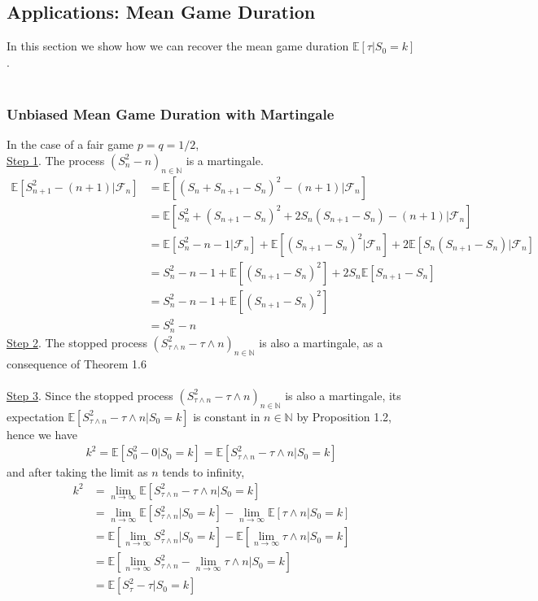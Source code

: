\documentclass[12pt]{extarticle}
\newcommand{\<}{\langle}
\renewcommand{\>}{\rangle}
\theoremstyle{definition}
\begin{document}
\newpage
\subsection{Applications: Mean Game Duration}
In this section we show how we can recover the mean game duration $\mathbb{E}[\tau | S_0 =k]$.\\ \\
\subsubsection{Unbiased Mean Game Duration with Martingale}
In the case of a fair game $p=q=1/2$,\\
\underline{Step 1}. The process $(S_n^2 -n)_{n \in \mathbb{N}}$ is a martingale. \\
\begin{align*}
    \mathbb{E}[S_{n+1}^2 -(n+1)|\mathcal{F}_n] &= \mathbb{E}[(S_n + S_{n+1} - S_n)^2 -(n+1)|\mathcal{F}_n]\\
    &= \mathbb{E}[S_n^2 + (S_{n+1} - S_n)^2 +2S_n(S_{n+1} - S_n)-(n+1)|\mathcal{F}_n]\\
    &= \mathbb{E}[S_n^2-n-1|\mathcal{F}_n] + \mathbb{E}[(S_{n+1} - S_n)^2|\mathcal{F}_n] +2\mathbb{E}[S_n(S_{n+1} - S_n)|\mathcal{F}_n]\\
    &= S_n^2-n-1 +\mathbb{E}[(S_{n+1} - S_n)^2] +2S_n\mathbb{E}[S_{n+1} - S_n]\\
    &= S_n^2-n-1 +\mathbb{E}[(S_{n+1} - S_n)^2]\\
    &= S_n^2-n
\end{align*}
\underline{Step 2}. The stopped process $(S_{\tau \wedge n}^2 -\tau \wedge n)_{n \in \mathbb{N}}$ is also a martingale, as a consequence of Theorem 1.6\\ \\
\underline{Step 3}. Since the stopped process $(S_{\tau \wedge n}^2 -\tau \wedge n)_{n \in \mathbb{N}}$ is also a martingale, its expectation $\mathbb{E}[S_{\tau \wedge n}^2 -\tau \wedge n | S_0 =k]$ is constant in $n \in \mathbb{N}$ by Proposition 1.2, hence we have
\begin{align*}
    k^2 = \mathbb{E}[S_0^2 -0 | S_0 =k] = \mathbb{E}[S_{\tau \wedge n}^2 -\tau \wedge n | S_0 =k]
\end{align*}
and after taking the limit as $n$ tends to infinity,
\begin{align*}
    k^2 &=\lim_{n \to \infty}\mathbb{E}[S_{\tau \wedge n}^2 -\tau \wedge n | S_0 =k]\\
    &=\lim_{n \to \infty}\mathbb{E}[S_{\tau \wedge n}^2| S_0 =k] -\lim_{n \to \infty}\mathbb{E}[\tau \wedge n| S_0 =k]\\
    &= \mathbb{E}\left[\lim_{n \to \infty}S_{\tau \wedge n}^2| S_0 =k\right] -\mathbb{E}\left[\lim_{n \to \infty} \tau \wedge n| S_0 =k\right]\\
    &= \mathbb{E}\left[\lim_{n \to \infty}S_{\tau \wedge n}^2 - \lim_{n \to \infty} \tau \wedge n| S_0 =k\right]\\
    &= \mathbb{E}[S_\tau^2 - \tau| S_0 =k]
\end{align*}
\end{document}
